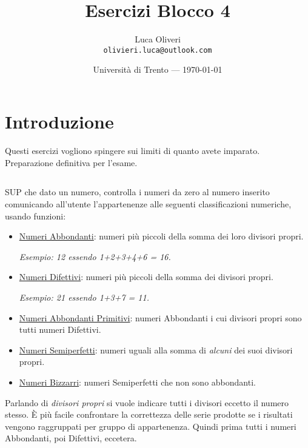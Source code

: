 \documentclass{article}
\title{Esercizi Blocco 4} %
\author{Luca Oliveri\\ \texttt{olivieri.luca@outlook.com}} %
\date{Università di Trento --- \today} %
\begin{document}
\maketitle %

\section*{Introduzione} %
Questi esercizi vogliono spingere sui limiti di quanto avete imparato. Preparazione definitiva per l'esame.

\setcounter{section}{4}

\subsection{}
SUP che dato un numero, controlla i numeri da zero al numero inserito comunicando all'utente l'appartenenze alle seguenti classificazioni numeriche, usando funzioni:
\begin{itemize}
	\item \href{https://en.wikipedia.org/wiki/Abundant_number}{Numeri Abbondanti}: numeri più piccoli della somma dei loro divisori propri. 
	
	\textit{Esempio: 12 essendo 1+2+3+4+6 = 16.}
	\item \href{https://en.wikipedia.org/wiki/Deficient_number}{Numeri Difettivi}: numeri più piccoli della somma dei divisori propri. 
	
	\textit{Esempio: 21 essendo 1+3+7 = 11. }
	\item \href{https://en.wikipedia.org/wiki/Primitive_abundant_number}{Numeri Abbondanti Primitivi}: numeri Abbondanti i cui divisori propri sono tutti numeri Difettivi.
	\item \href{https://en.wikipedia.org/wiki/Semiperfect_number}{Numeri Semiperfetti}: numeri uguali alla somma di \textit{alcuni} dei suoi divisori propri.
	\item \href{https://en.wikipedia.org/wiki/Weird_number}{Numeri Bizzarri}: numeri Semiperfetti che non sono abbondanti. 
\end{itemize}

\begin{info}
	Parlando di \textit{divisori propri} si vuole indicare tutti i divisori eccetto il numero stesso. È più facile confrontare la correttezza delle serie prodotte se i risultati vengono raggruppati per gruppo di appartenenza. Quindi prima tutti i numeri Abbondanti, poi Difettivi, eccetera.
\end{info}
\end{document}

